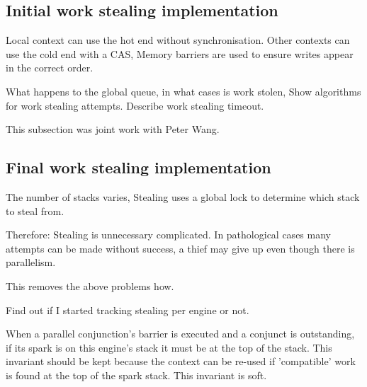 



\subsection{Initial work stealing implementation}



Local context can use the hot end without synchronisation.
Other contexts can use the cold end with a CAS,
Memory barriers are used to ensure writes appear in the correct order.

What happens to the global queue,
in what cases is work stolen,
Show algorithms for work stealing attempts.
Describe work stealing timeout.


This subsection was joint work with Peter Wang.

\subsection{Final work stealing implementation}

The number of stacks varies,
Stealing uses a global lock to determine which stack to steal from.

Therefore:
Stealing is unnecessary complicated.
In pathological cases many attempts can be made without success,
a thief may give up even though there is parallelism.

This removes the above problems how.

Find out if I started tracking stealing per engine or not.

When a parallel conjunction's barrier is executed and a conjunct is
outstanding, if its spark is on this engine's stack it must be at the top of
the stack.
This invariant should be kept because the context can be re-used if
'compatible' work is found at the top of the spark stack.
This invariant is soft.


